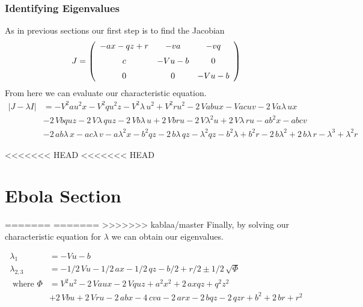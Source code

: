 \documentclass{article}
\begin{document}
\subsubsection{Identifying Eigenvalues}
As in previous sections our first step is to find the Jacobian
\begin{equation}
J = \left( \begin {array}{ccc} -ax-qz+r&-va&-vq\\ \noalign{\medskip}c&-Vu
-b&0\\ \noalign{\medskip}0&0&-Vu-b\end {array} \right) 
\end{equation}
From here we can evaluate our characteristic equation. 
\begin{equation}
	\begin{split}
		|J-\lambda I| &= -{V}^{2}a{u}^{2}x-{V}^{2}q{u}^{2}z-{V}^{2}\lambda\,{u}^{2}+{V}^{2}r{u}
		^{2}-2\,Vabux-Vacuv-2\,Va\lambda\,ux \\
		&-2\,Vbquz-2\,V\lambda\,quz-2\,Vb
		\lambda\,u+2\,Vbru-2\,V{\lambda}^{2}u+2\,V\lambda\,ru-a{b}^{2}x-abcv \\
		&-2\,ab\lambda\,x-ac\lambda\,v-a{\lambda}^{2}x-{b}^{2}qz-2\,b\lambda\,qz-
		{\lambda}^{2}qz-{b}^{2}\lambda+{b}^{2}r-2\,b{\lambda}^{2}+2\,b\lambda
		\,r-{\lambda}^{3}+{\lambda}^{2}r			
	\end{split}
\end{equation}

<<<<<<< HEAD
<<<<<<< HEAD
\section{Ebola Section}
=======
=======
>>>>>>> kablaa/master
Finally, by solving our characteristic equation for $\lambda$ we can obtain our eigenvalues.

\begin{equation}
	\begin{split}
		\lambda_1 &= -Vu-b \\
		\lambda_{2,3} &= -1/2\,Vu-1/2\,ax-1/2\,qz-b/2+r/2 \pm 1/2\,\sqrt {\Phi}	\\
		\text{ where } \Phi  &= {V}^{2}{u}^{2}-2\,Vaux-2
		\,Vquz+{a}^{2}{x}^{2}+2\,axqz+{q}^{2}{z}^{2} \\
		&+2\,Vbu+2\,Vru-2\,abx-4\,c
		va-2\,arx-2\,bqz-2\,qzr+{b}^{2}+2\,br+{r}^{2}		
	\end{split}
\end{equation}
\end{document}
